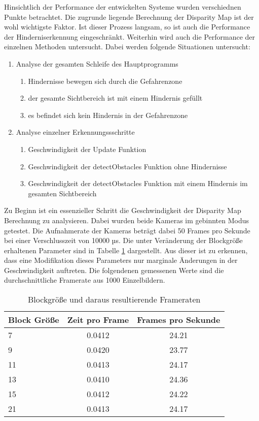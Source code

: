 Hinsichtlich der Performance der entwickelten Systeme wurden verschiednen Punkte betrachtet. Die zugrunde liegende Berechnung der Disparity Map ist der wohl wichtigste Faktor. Ist dieser Prozess langsam, so ist auch die Performance der Hinderniserkennung eingeschränkt. Weiterhin wird auch die Performance der einzelnen Methoden untersucht. Dabei werden folgende Situationen untersucht:
\begin{enumerate}
	\item Analyse der gesamten Schleife des Hauptprogramms
	\begin{enumerate}
		\item Hindernisse bewegen sich durch die Gefahrenzone
		\item der gesamte Sichtbereich ist mit einem Hindernis gefüllt
		\item es befindet sich kein Hindernis in der Gefahrenzone
	\end{enumerate}
	\item Analyse einzelner Erkennungssschritte
	\begin{enumerate}
		\item Geschwindigkeit der Update Funktion
		\item Geschwindigkeit der detectObstacles Funktion ohne Hindernisse
		\item Geschwindigkeit der detectObstacles Funktion mit einem Hindernis im gesamten Sichtbereich
	\end{enumerate}
\end{enumerate}

\noindent
Zu Beginn ist ein essenzieller Schritt die Geschwindigkeit der Disparity Map Berechnung zu analysieren. Dabei wurden beide Kameras im gebinnten Modus getestet. Die Aufnahmerate der Kameras beträgt dabei 50 Frames pro Sekunde bei einer Verschlusszeit von 10000 µs. Die unter Veränderung der Blockgröße erhaltenen Parameter sind in Tabelle \ref{tbl:disparity_framerate} dargestellt. Aus dieser ist zu erkennen, dass eine Modifikation dieses Parameters nur marginale Änderungen in der Geschwindigkeit auftreten. Die folgendenen gemessenen Werte sind die durchschnittliche Framerate aus 1000 Einzelbildern.

\begin{table}[h]
	\centering
	\begin{tabular}{|l|c|c|}
	\hline
	Block Größe & Zeit pro Frame & Frames pro Sekunde \\ \hline
	7           & 0.0412         & 24.21            \\ \hline
	9           & 0.0420         & 23.77            \\ \hline
	11          & 0.0413         & 24.17            \\ \hline
	13          & 0.0410         & 24.36            \\ \hline
	15          & 0.0412         & 24.22            \\ \hline
	21          & 0.0413         & 24.17            \\ \hline
	\end{tabular}
	\caption{Blockgröße und daraus resultierende Frameraten}
	\label{tbl:disparity_framerate}
\end{table}

